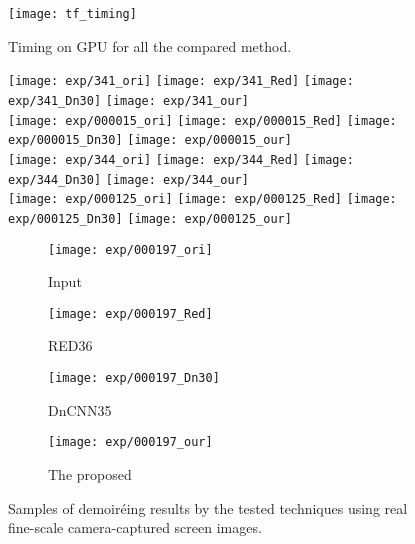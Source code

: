 \documentclass[10pt,twocolumn,letterpaper]{article}
\begin{document}
\begin{figure}[h]
	\centering
	\texttt{[image: tf\_timing]}
	\caption{Timing on GPU for all the compared method.}
	\label{fig:timing}
\end{figure}

\begin{figure*}
  \centering
  \texttt{[image: exp/341\_ori]}
  \texttt{[image: exp/341\_Red]}
  \texttt{[image: exp/341\_Dn30]}
  \texttt{[image: exp/341\_our]} \\
  \vspace{0.2ex}
  \texttt{[image: exp/000015\_ori]}
  \texttt{[image: exp/000015\_Red]}
  \texttt{[image: exp/000015\_Dn30]}
  \texttt{[image: exp/000015\_our]} \\
  \vspace{0.2ex}
  \texttt{[image: exp/344\_ori]}
  \texttt{[image: exp/344\_Red]}
  \texttt{[image: exp/344\_Dn30]}
  \texttt{[image: exp/344\_our]} \\
  \vspace{0.2ex}
  \texttt{[image: exp/000125\_ori]}
  \texttt{[image: exp/000125\_Red]}
  \texttt{[image: exp/000125\_Dn30]}
  \texttt{[image: exp/000125\_our]} \\
  \vspace{0.2ex}
  \begin{subfigure}{0.23\linewidth}
    \centering
    \texttt{[image: exp/000197\_ori]}
    \caption{Input}
  \end{subfigure}
  \begin{subfigure}{0.23\linewidth}
    \centering
    \texttt{[image: exp/000197\_Red]}
    \caption{RED36}
  \end{subfigure}
  \begin{subfigure}{0.23\linewidth}
    \centering
    \texttt{[image: exp/000197\_Dn30]}
    \caption{DnCNN35}
  \end{subfigure}
  \begin{subfigure}{0.23\linewidth}
    \centering
    \texttt{[image: exp/000197\_our]}
    \caption{The proposed}
  \end{subfigure}
  \caption{Samples of demoir\'eing results by the tested techniques
    using real fine-scale camera-captured screen images.}
  \label{fig:exp_res}
\end{figure*}
\end{document}
